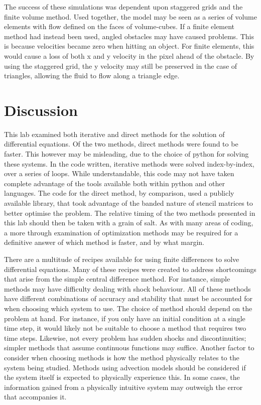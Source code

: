 \documentclass[twocolumn]{article}
\begin{document}
The success of these simulations was dependent upon staggered grids and the finite volume method. Used together, the model may be seen as a series of volume elements with flow defined on the faces of volume-cubes. If a finite element method had instead been used, angled obstacles may have caused problems. This is because velocities became zero when hitting an object. For finite elements, this would cause a loss of both x and y velocity in the pixel ahead of the obstacle. By using the staggered grid, the y velocity may still be preserved in the case of triangles, allowing the fluid to flow along a triangle edge. 

\section{Discussion}

This lab examined both iterative and direct methods for the solution of differential equations. Of the two methods, direct methods were found to be faster. This however may be misleading, due to the choice of python for solving these systems. In the code written, iterative methods were solved index-by-index, over a series of loops. While understandable, this code may not have taken complete advantage of the tools available both within python and other languages. The code for the direct method, by comparison, used a publicly available library, that took advantage of the banded nature of stencil matrices to better optimise the problem. The relative timing of the two methods presented in this lab should then be taken with a grain of salt. As with many areas of coding, a more through examination of optimization methods may be required for a definitive answer of which method is faster, and by what margin.

There are a multitude of recipes available for using finite differences to solve differential equations. Many of these recipes were created to address shortcomings that arise from the simple central difference method. For instance, simple methods may have difficulty dealing with shock behaviour. All of these methods have different combinations of accuracy and stability that must be accounted for when choosing which system to use. The choice of method should depend on the problem at hand. For instance, if you only have an initial condition at a single time step, it would likely not be suitable to choose a method that requires two time steps. Likewise, not every problem has sudden shocks and discontinuities; simpler methods that assume continuous functions may suffice. Another factor to consider when choosing methods is how the method physically relates to the system being studied. Methods using advection models should be considered if the system itself is expected to physically experience this. In some cases, the information gained from a physically intuitive system may outweigh the error that accompanies it.
\end{document}
